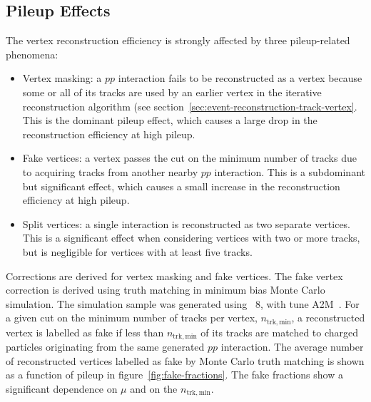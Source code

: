 \subsection{Pileup Effects}\label{sec:luminosity-vertex-pileup}
The vertex reconstruction efficiency is strongly affected by three pileup-related phenomena:

\begin{itemize}
	\item Vertex masking: a $pp$ interaction fails to be reconstructed as a vertex because some or all of its tracks are used by an earlier vertex in the iterative reconstruction algorithm (see section~\ref{sec:event-reconstruction-track-vertex}. This is the dominant pileup effect, which causes a large drop in the reconstruction efficiency at high pileup.
	\item Fake vertices: a vertex passes the cut on the minimum number of tracks due to acquiring tracks from another nearby $pp$ interaction. This is a subdominant but significant effect, which causes a small increase in the reconstruction efficiency at high pileup.
	\item Split vertices: a single interaction is reconstructed as two separate vertices. This is a significant effect when considering vertices with two or more tracks, but is negligible for vertices with at least five tracks.
\end{itemize}

Corrections are derived for vertex masking and fake vertices. The fake vertex correction is derived using truth matching in minimum bias Monte Carlo simulation. The simulation sample was generated using \pythia~8, with tune A2M~\cite{pythia8,AUET2}. For a given cut on the minimum number of tracks per vertex, $n_{\mathrm{trk,min}}$, a reconstructed vertex is labelled as fake if less than $n_{\mathrm{trk,min}}$ of its tracks are matched to charged particles originating from the same generated $pp$ interaction. The average number of reconstructed vertices labelled as fake by Monte Carlo truth matching is shown as a function of pileup in figure~\ref{fig:fake-fractions}. The fake fractions show a significant dependence on $\mu$ and on the $n_{\mathrm{trk,min}}$.


